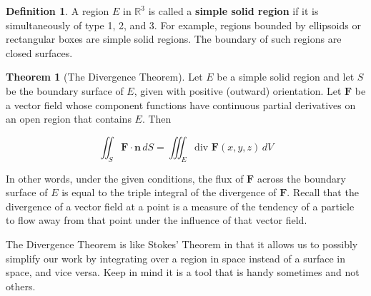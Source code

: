\documentclass[11pt,oneside,english]{amsart}
\theoremstyle{definition}
\newtheorem{theorem}{Theorem}
\newtheorem*{definition}{Definition}
\newcommand{\R}{\mathbb{R}}
\begin{document}
\begin{definition}
A region $E$ in $\R^3$ is called a \textbf{simple solid region} if it is simultaneously of type 1, 2, and 3. For example, regions bounded by ellipsoids or rectangular boxes are simple solid regions. The boundary of such regions are closed surfaces.
\end{definition}

\begin{theorem}[The Divergence Theorem]
Let $E$ be a simple solid region and let $S$ be the boundary surface of $E$, given with positive (outward) orientation. Let $\mathbf{F}$ be a vector field whose component functions have continuous partial derivatives on an open region that contains $E$. Then

\[
\iint_S\mathbf{F}\cdot\mathbf{n}\,dS=\iiint_E\text{div }\mathbf{F}(x,y,z)\,dV
\]

In other words, under the given conditions, the flux of $\mathbf{F}$ across the boundary surface of $E$ is equal to the triple integral of the divergence of $\mathbf{F}$. Recall that the divergence of a vector field at a point is a measure of the tendency of a particle to flow away from that point under the influence of that vector field.
\end{theorem}

The Divergence Theorem is like Stokes' Theorem in that it allows us to possibly simplify our work by integrating over a region in space instead of a surface in space, and vice versa. Keep in mind it is a tool that is handy sometimes and not others.
\end{document}
